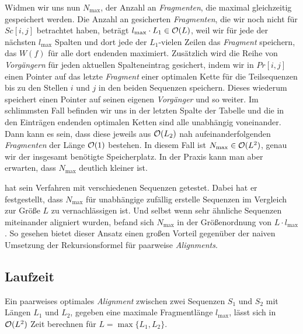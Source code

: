 Widmen wir uns nun $N_{\max}$, der Anzahl an \emph{Fragmenten}, die maximal gleichzeitig gespeichert werden. Die Anzahl an gesicherten \emph{Fragmenten}, die wir noch nicht für $Sc[i,j]$ betrachtet haben, beträgt $l_{\max} \cdot L_1 \in \mathcal{O}(L)$, weil wir für jede der nächsten $l_{\max}$ Spalten und dort jede der $L_1$-vielen Zeilen das \emph{Fragment} speichern, das $W(f)$ für alle dort endenden maximiert. Zusätzlich wird die Reihe von \emph{Vorgängern} für jeden aktuellen Spalteneintrag gesichert, indem wir in $Pr[i,j]$ einen Pointer auf das letzte \emph{Fragment} einer optimalen Kette für die Teilsequenzen bis zu den Stellen $i$ und $j$ in den beiden Sequenzen speichern. Dieses wiederum speichert einen Pointer auf seinen eigenen \emph{Vorgänger} und so weiter. Im schlimmsten Fall befinden wir uns in der letzten Spalte der Tabelle und die in den Einträgen endenden optimalen Ketten sind alle unabhängig voneinander. Dann kann es sein, dass diese jeweils aus $\mathcal{O}(L_2)$ nah aufeinanderfolgenden \emph{Fragmenten} der Länge $\mathcal{O}(1)$ bestehen. In diesem Fall ist $N_{\max} \in \mathcal{O}(L^2)$, genau wir der insgesamt benötigte Speicherplatz. In der Praxis kann man aber erwarten, dass $N_{\max}$ deutlich kleiner ist. 

\cite{m02} hat sein Verfahren mit verschiedenen Sequenzen getestet. Dabei hat er festgestellt, dass $N_{\max}$ für unabhängige zufällig erstelle Sequenzen im Vergleich zur Größe $L$ zu vernachlässigen ist. Und selbst wenn sehr ähnliche Sequenzen miteinander aligniert wurden, befand sich $N_{\max}$ in der Größenordnung von $L \cdot l_{\max}$. So gesehen bietet dieser Ansatz einen großen Vorteil gegenüber der naiven Umsetzung der Rekursionsformel für paarweise \emph{Alignments}.

\subsection{Laufzeit}

\begin{satz}
	Ein paarweises optimales \emph{Alignment} zwischen zwei Sequenzen $S_1$ und $S_2$ mit Längen $L_1$ und $L_2$, gegeben eine maximale Fragmentlänge $l_{\max}$, lässt sich in $\mathcal{O}(L^2)$ Zeit berechnen für $L = \max\{L_1, L_2\}$.
\end{satz}

